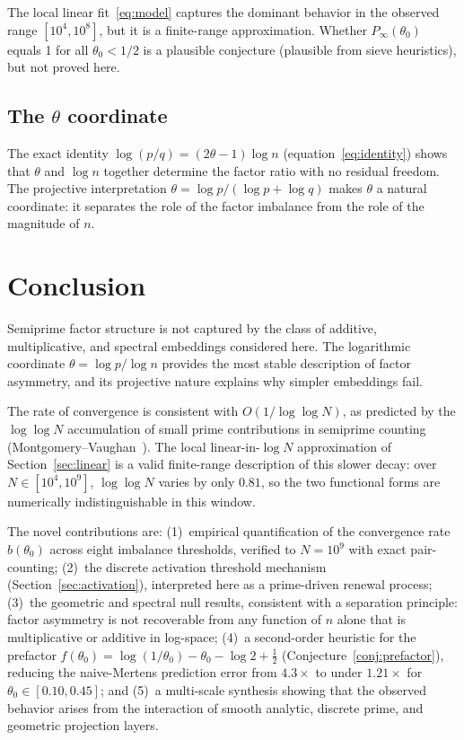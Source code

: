 \documentclass[11pt]{article}
\theoremstyle{definition}
\begin{document}
The local linear fit~\eqref{eq:model} captures the dominant behavior in the observed
range \([10^4, 10^8]\), but it is a finite-range approximation.  Whether
\(P_\infty(\theta_0)\) equals 1 for all \(\theta_0<1/2\) is a plausible conjecture
(plausible from sieve heuristics), but not proved here.

\subsection{The \(\theta\) coordinate}

The exact identity \(\log(p/q) = (2\theta-1)\log n\) (equation~\eqref{eq:identity})
shows that \(\theta\) and \(\log n\) together determine the factor ratio with no
residual freedom.  The projective interpretation \(\theta = \log p / (\log p + \log q)\)
makes \(\theta\) a natural coordinate: it separates the role of the factor imbalance
from the role of the magnitude of \(n\).


\section{Conclusion}

Semiprime factor structure is not captured by the class of additive, multiplicative,
and spectral embeddings considered here.  The logarithmic coordinate
\(\theta = \log p / \log n\) provides the most stable description of factor asymmetry,
and its projective nature explains why simpler embeddings fail.

The rate of convergence is consistent with \(O(1/\!\log\log N)\), as predicted by the
\(\log\log N\) accumulation of small prime contributions in semiprime counting
(Montgomery--Vaughan~\cite{montgomery2007}).  The local linear-in-\(\log N\)
approximation of Section~\ref{sec:linear} is a valid finite-range description of this
slower decay: over \(N \in [10^4, 10^9]\), \(\log\log N\) varies by only \(0.81\),
so the two functional forms are numerically indistinguishable in this window.

The novel contributions are:
(1)~empirical quantification of the convergence rate \(b(\theta_0)\) across eight
imbalance thresholds, verified to \(N = 10^9\) with exact pair-counting;
(2)~the discrete activation threshold mechanism (Section~\ref{sec:activation}),
interpreted here as a prime-driven renewal process;
(3)~the geometric and spectral null results, consistent with a separation principle:
factor asymmetry is not recoverable from any function of \(n\) alone that is
multiplicative or additive in log-space;
(4)~a second-order heuristic for the prefactor
\(f(\theta_0) = \log(1/\theta_0) - \theta_0 - \log 2 + \tfrac{1}{2}\)
(Conjecture~\ref{conj:prefactor}), reducing the naive-Mertens prediction error from
\(4.3\times\) to under \(1.21\times\) for \(\theta_0 \in [0.10, 0.45]\); and
(5)~a multi-scale synthesis showing that the observed behavior arises from the
interaction of smooth analytic, discrete prime, and geometric projection layers.
\end{document}
